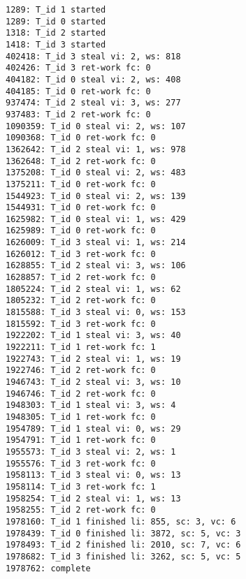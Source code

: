 \begin{lstlisting}[label=apptracews,caption=An example trace produced by the `wsmandelbrot' binary. Trace mode is two.]
1289: T_id 1 started
1289: T_id 0 started
1318: T_id 2 started
1418: T_id 3 started
402418: T_id 3 steal vi: 2, ws: 818
402426: T_id 3 ret-work fc: 0
404182: T_id 0 steal vi: 2, ws: 408
404185: T_id 0 ret-work fc: 0
937474: T_id 2 steal vi: 3, ws: 277
937483: T_id 2 ret-work fc: 0
1090359: T_id 0 steal vi: 2, ws: 107
1090368: T_id 0 ret-work fc: 0
1362642: T_id 2 steal vi: 1, ws: 978
1362648: T_id 2 ret-work fc: 0
1375208: T_id 0 steal vi: 2, ws: 483
1375211: T_id 0 ret-work fc: 0
1544923: T_id 0 steal vi: 2, ws: 139
1544931: T_id 0 ret-work fc: 0
1625982: T_id 0 steal vi: 1, ws: 429
1625989: T_id 0 ret-work fc: 0
1626009: T_id 3 steal vi: 1, ws: 214
1626012: T_id 3 ret-work fc: 0
1628855: T_id 2 steal vi: 3, ws: 106
1628857: T_id 2 ret-work fc: 0
1805224: T_id 2 steal vi: 1, ws: 62
1805232: T_id 2 ret-work fc: 0
1815588: T_id 3 steal vi: 0, ws: 153
1815592: T_id 3 ret-work fc: 0
1922202: T_id 1 steal vi: 3, ws: 40
1922211: T_id 1 ret-work fc: 1
1922743: T_id 2 steal vi: 1, ws: 19
1922746: T_id 2 ret-work fc: 0
1946743: T_id 2 steal vi: 3, ws: 10
1946746: T_id 2 ret-work fc: 0
1948303: T_id 1 steal vi: 3, ws: 4
1948305: T_id 1 ret-work fc: 0
1954789: T_id 1 steal vi: 0, ws: 29
1954791: T_id 1 ret-work fc: 0
1955573: T_id 3 steal vi: 2, ws: 1
1955576: T_id 3 ret-work fc: 0
1958113: T_id 3 steal vi: 0, ws: 13
1958114: T_id 3 ret-work fc: 1
1958254: T_id 2 steal vi: 1, ws: 13
1958255: T_id 2 ret-work fc: 0
1978160: T_id 1 finished li: 855, sc: 3, vc: 6
1978439: T_id 0 finished li: 3872, sc: 5, vc: 3
1978493: T_id 2 finished li: 2010, sc: 7, vc: 6
1978682: T_id 3 finished li: 3262, sc: 5, vc: 5
1978762: complete
\end{lstlisting}

